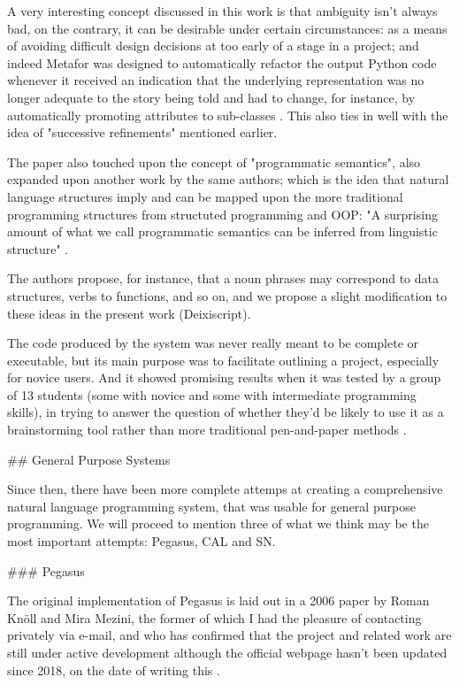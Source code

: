 A very interesting concept discussed in this work is that ambiguity isn't always bad, on the contrary, it can be desirable under certain circumstances: as a means of avoiding difficult design decisions at too early of a stage in a project; and indeed Metafor was designed to automatically refactor the output Python code whenever it received an indication that the underlying representation was no longer adequate to the story being told and had to change, for instance, by automatically promoting attributes to sub-classes \cite{liu2005metafor}. This also ties in well with the idea of "successive refinements" mentioned earlier.

The paper also touched upon the concept of "programmatic semantics", also expanded upon another work \cite{liu2005programmatic} by the same authors; which is the idea that natural language structures imply and can be mapped upon the more traditional programming structures from structuted programming and OOP: "A surprising amount of what we call programmatic semantics can be inferred from linguistic structure" \cite{liu2005metafor}.

The authors propose, for instance, that a noun phrases may correspond to data structures, verbs to functions, and so on, and we propose a slight modification to these ideas in the present work (Deixiscript).

The code produced by the system was never really meant to be complete or executable, but its main purpose was to facilitate outlining a project, especially for novice users. And it showed promising results when it was tested by a group of 13 students (some with novice and some with intermediate programming skills), in trying to answer the question of whether they'd be likely to use it as a brainstorming tool rather than more traditional pen-and-paper methods \cite{liu2005metafor}.

## General Purpose Systems

Since then, there have been more complete attemps at creating a comprehensive natural language programming system, that was usable for general purpose programming. We will proceed to mention three of what we think may be the most important attempts: Pegasus, CAL and SN.

### Pegasus

The original implementation of Pegasus is laid out in a 2006 paper \cite{knoll2006pegasus} by Roman Knöll and Mira Mezini, the former of which I had the pleasure of contacting privately via e-mail, and who has confirmed that the project and related work are still under active development although the official webpage hasn't been updated since 2018, on the date of writing this \cite{pegasuswebsite}.

